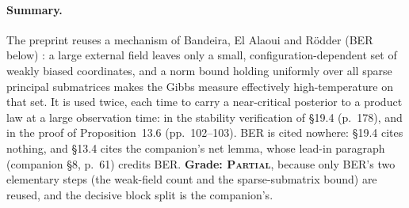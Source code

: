 \documentclass[11pt]{article}
\newcommand{\ploc}[2]{#1}
\newcommand{\sloc}[2]{\cite[#2]{#1}}
\newcommand{\grade}[1]{\textsc{#1}}
\begin{document}
\paragraph{Summary.}
The preprint reuses a mechanism of Bandeira, El Alaoui and R\"odder (BER
below) \sloc{BandeiraElAlaouiRodder2026-GlauberHighOverlapGibbs}{Thm.~1.1 and
proof of Lemma~2.3}: a large external field leaves only a small,
configuration-dependent set of weakly biased coordinates, and a norm bound
holding uniformly over all sparse principal submatrices makes the Gibbs
measure effectively high-temperature on that set. It is used twice, each time
to carry a near-critical posterior to a product law at a large observation
time: in the stability verification of
\ploc{\S19.4 (p.~178)}{cap-entropy.tex:530--549}, and in the proof of
\ploc{Proposition~13.6 (pp.~102--103)}{profile-positive.tex:1556--1698}. BER
is cited nowhere: \S19.4 cites nothing, and \S13.4 cites the companion's net
lemma, whose lead-in paragraph
\ploc{(companion \S8, p.~61)}{terminal.tex:217--223} credits BER.
\textbf{Grade: \grade{Partial}}, because only BER's two elementary steps (the weak-field
count and the sparse-submatrix bound) are reused, and the decisive block split
is the companion's.
\end{document}
